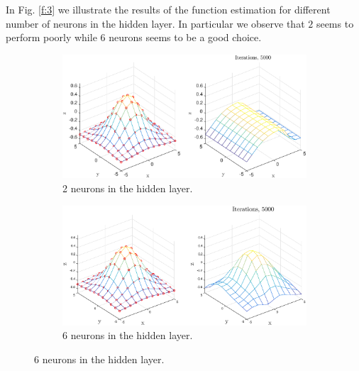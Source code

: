 \documentclass[letterpaper, 10 pt, conference]{ieeeconf}  %
\begin{document}
In Fig. \ref{f:3} we illustrate the results of the function estimation for different number of neurons in the hidden layer. In particular we observe that $2$ seems to perform poorly while $6$ neurons seems to be a good choice. 
\begin{figure}
    \centering
    \begin{subfigure}[b]{0.85\textwidth}
        \includegraphics[width=\textwidth]{function_approximation_2}
        \caption{2 neurons in the hidden layer.}
        \label{fig:31}
    \end{subfigure}


    \begin{subfigure}[b]{0.85\textwidth}
        \includegraphics[width=\textwidth]{function_approximation_6}
        \caption{6 neurons in the hidden layer.}
        \label{fig:32}
    \end{subfigure}



\end{figure}
\end{document}
